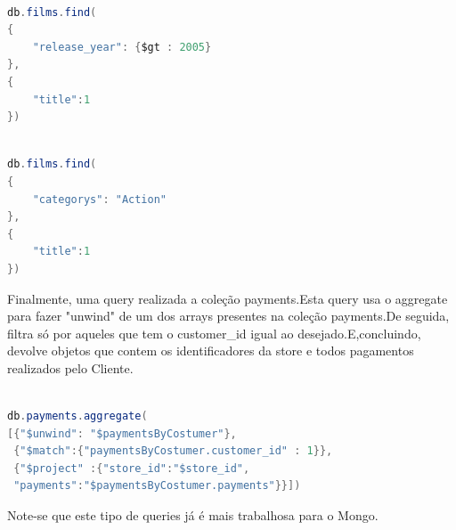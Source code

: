 \begin{lstlisting}[language=java,caption=Query ao Mongo para devolver todos os Filmes estreados depois de 2005]

db.films.find(
{
	"release_year": {$gt : 2005}
},
{
	"title":1
})

\end{lstlisting}

\begin{lstlisting}[language=java,caption=Query ao Mongo para devolver todos os Filmes da Categoria Action]

db.films.find(
{
	"categorys": "Action"
},
{
	"title":1
})
\end{lstlisting}

Finalmente, uma query realizada a coleção payments.Esta query usa o aggregate para fazer "unwind" de um dos arrays presentes na coleção payments.De seguida, filtra só por aqueles que tem o customer\_id igual ao desejado.E,concluindo, devolve objetos que contem os identificadores da store e todos pagamentos realizados pelo Cliente.

\begin{lstlisting}[language=java,caption=Query para obter as faturas de um dado Cliente organizado por Store]

db.payments.aggregate(
[{"$unwind": "$paymentsByCostumer"},
 {"$match":{"paymentsByCostumer.customer_id" : 1}},
 {"$project" :{"store_id":"$store_id",
 "payments":"$paymentsByCostumer.payments"}}])

\end{lstlisting}

Note-se que este tipo de queries já é mais trabalhosa para o Mongo.
